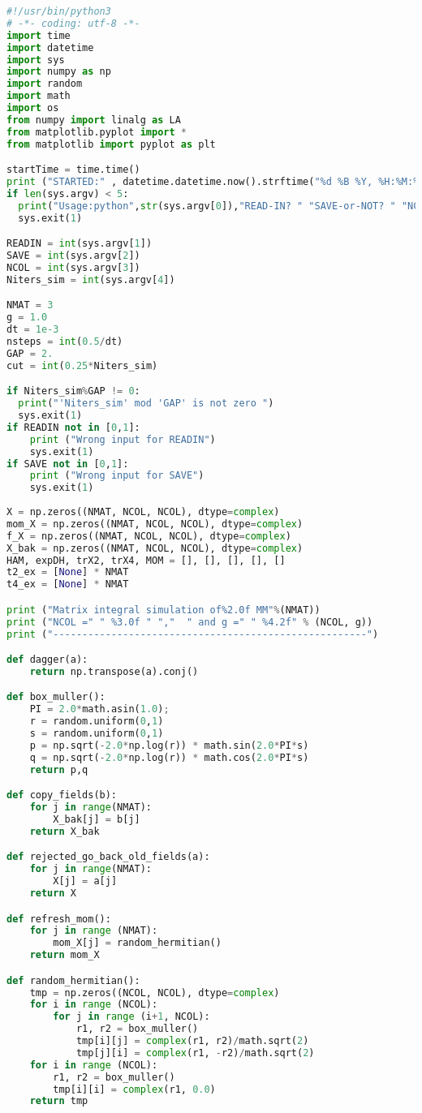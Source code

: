 \begin{lstlisting}[language=Python]
#!/usr/bin/python3
# -*- coding: utf-8 -*-
import time 
import datetime 
import sys
import numpy as np
import random
import math
import os 
from numpy import linalg as LA
from matplotlib.pyplot import *
from matplotlib import pyplot as plt

startTime = time.time()
print ("STARTED:" , datetime.datetime.now().strftime("%d %B %Y, %H:%M:%S"))
if len(sys.argv) < 5:
  print("Usage:python",str(sys.argv[0]),"READ-IN? " "SAVE-or-NOT? " "NCOL " "NITERS")
  sys.exit(1)

READIN = int(sys.argv[1])
SAVE = int(sys.argv[2])
NCOL = int(sys.argv[3]) 
Niters_sim = int(sys.argv[4])

NMAT = 3
g = 1.0
dt = 1e-3
nsteps = int(0.5/dt) 
GAP = 2.
cut = int(0.25*Niters_sim) 

if Niters_sim%GAP != 0:
  print("'Niters_sim' mod 'GAP' is not zero ")
  sys.exit(1) 
if READIN not in [0,1]:
    print ("Wrong input for READIN")
    sys.exit(1)
if SAVE not in [0,1]:
    print ("Wrong input for SAVE")
    sys.exit(1)
  
X = np.zeros((NMAT, NCOL, NCOL), dtype=complex)
mom_X = np.zeros((NMAT, NCOL, NCOL), dtype=complex)
f_X = np.zeros((NMAT, NCOL, NCOL), dtype=complex)
X_bak = np.zeros((NMAT, NCOL, NCOL), dtype=complex)
HAM, expDH, trX2, trX4, MOM = [], [], [], [], []
t2_ex = [None] * NMAT
t4_ex = [None] * NMAT

print ("Matrix integral simulation of%2.0f MM"%(NMAT)) 
print ("NCOL =" " %3.0f " ","  " and g =" " %4.2f" % (NCOL, g)) 
print ("------------------------------------------------------")

def dagger(a):
	return np.transpose(a).conj()

def box_muller():  
	PI = 2.0*math.asin(1.0);    
	r = random.uniform(0,1)
	s = random.uniform(0,1)
	p = np.sqrt(-2.0*np.log(r)) * math.sin(2.0*PI*s)
	q = np.sqrt(-2.0*np.log(r)) * math.cos(2.0*PI*s)
	return p,q

def copy_fields(b):
	for j in range(NMAT):
		X_bak[j] = b[j]
	return X_bak

def rejected_go_back_old_fields(a):
	for j in range(NMAT):
		X[j] = a[j]
	return X

def refresh_mom():
	for j in range (NMAT):
		mom_X[j] = random_hermitian()
	return mom_X

def random_hermitian():
	tmp = np.zeros((NCOL, NCOL), dtype=complex)
	for i in range (NCOL):
		for j in range (i+1, NCOL):
			r1, r2 = box_muller()
			tmp[i][j] = complex(r1, r2)/math.sqrt(2)
			tmp[j][i] = complex(r1, -r2)/math.sqrt(2)
	for i in range (NCOL):
		r1, r2 = box_muller()
		tmp[i][i] = complex(r1, 0.0) 
	return tmp


\end{lstlisting}
